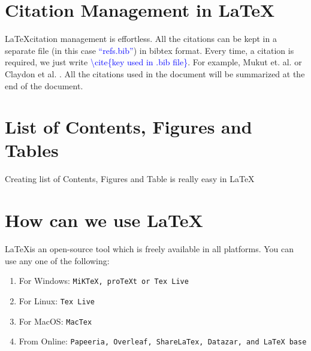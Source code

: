 \documentclass[a4paper, 12pt, one column]{article}
\begin{document}
\begin{table}[!httb]
    \caption{A Sample Table}
    \label{tb1}
    \end{table}

\section{Citation Management in \LaTeX}

\LaTeX \space citation management is effortless. All the citations can be kept in a separate file (in this case \textcolor{blue}{``refs.bib''}) in bibtex format. Every time, a citation is required, we just write \textcolor{blue}{ \textbackslash cite\{key used in .bib file\}}. For example, Mukut et. al. \cite{Mukut2022Jul} or Claydon et al. \cite{Claydon17}. All the citations used in the document will be summarized at the end of the document. 

\section{List of Contents,  Figures and Tables}


 {
        {
        \begin{minipage}{0.9\textwidth}
            \centering
        Creating list of Contents, Figures and Table is really easy in \LaTeX
        \end{minipage}
        }
    }
\tableofcontents
\listoffigures
\listoftables



\section{How can we use \LaTeX}
\LaTeX \space is an open-source tool which is freely available in all platforms. You can use any one of the following: 
\begin{enumerate}
    \item For Windows: \texttt{MiKTeX, proTeXt or Tex Live}
    \item For Linux: \texttt{Tex Live}
    \item For MacOS: \texttt{MacTex}
    \item From Online: \texttt{Papeeria, Overleaf, ShareLaTex, Datazar, and LaTeX base}
\end{enumerate}
\end{document}
